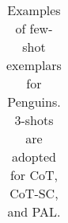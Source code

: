 \begin{table}[htbp]
\begin{tabular}{p{}}
    \end{tabular}
     \caption{Examples of few-shot exemplars for Penguins. 3-shots are adopted for CoT, CoT-SC, and PAL.}
    \label{tab:exp-penguins}
\end{table}



